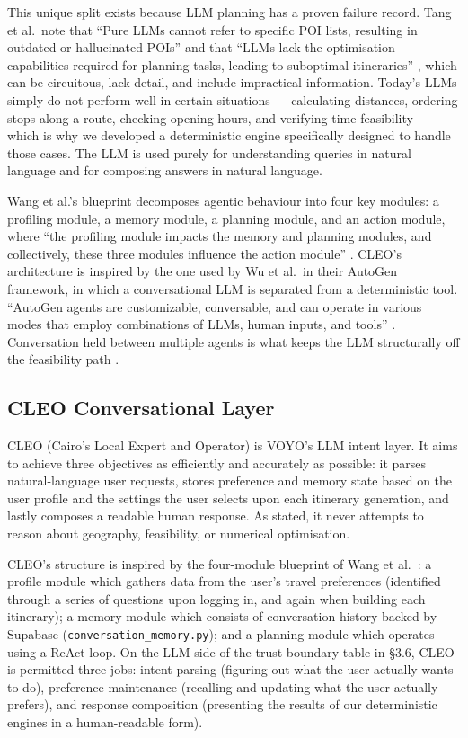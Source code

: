 This unique split exists because LLM planning has a proven failure record. Tang et al.\ note that
``Pure LLMs cannot refer to specific POI lists, resulting in outdated or hallucinated POIs''
\cite[§1, p.~1]{itinera_tang_2024} and that ``LLMs lack the optimisation capabilities required for
planning tasks, leading to suboptimal itineraries'' \cite[§1, p.~1]{itinera_tang_2024}, which can
be circuitous, lack detail, and include impractical information. Today's LLMs simply do not
perform well in certain situations — calculating distances, ordering stops along a route, checking
opening hours, and verifying time feasibility — which is why we developed a deterministic engine
specifically designed to handle those cases. The LLM is used purely for understanding queries in
natural language and for composing answers in natural language.

Wang et al.'s blueprint decomposes agentic behaviour into four key modules: a profiling module,
a memory module, a planning module, and an action module, where ``the profiling module impacts
the memory and planning modules, and collectively, these three modules influence the action
module'' \cite[§2.1]{wang_agent_survey}. CLEO's architecture is inspired by the one used by Wu
et al.\ in their AutoGen framework, in which a conversational LLM is separated from a
deterministic tool. ``AutoGen agents are customizable, conversable, and can operate in various
modes that employ combinations of LLMs, human inputs, and tools'' \cite[Abstract]{autogen}.
Conversation held between multiple agents is what keeps the LLM structurally off the
feasibility path \cite[§1]{autogen}.


\subsection{CLEO Conversational Layer}

CLEO (Cairo's Local Expert and Operator) is VOYO's LLM intent layer. It aims to achieve three
objectives as efficiently and accurately as possible: it parses natural-language user requests,
stores preference and memory state based on the user profile and the settings the user selects
upon each itinerary generation, and lastly composes a readable human response. As stated, it
never attempts to reason about geography, feasibility, or numerical optimisation.

CLEO's structure is inspired by the four-module blueprint of Wang et al.\ \cite[§2.1]{wang_agent_survey}:
a profile module which gathers data from the user's travel preferences (identified through a
series of questions upon logging in, and again when building each itinerary); a memory module
which consists of conversation history backed by Supabase (\texttt{conversation\_memory.py});
and a planning module which operates using a ReAct loop. On the LLM side of the trust boundary
table in §3.6, CLEO is permitted three jobs: intent parsing (figuring out what the user actually
wants to do), preference maintenance (recalling and updating what the user actually prefers),
and response composition (presenting the results of our deterministic engines in a
human-readable form).


